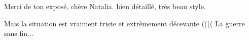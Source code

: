  
 
 
 
 

\qqSecCmt


Merci de ton exposé, chère Natalia. bien détaillé, très beau style.

Mais la situation est vraiment triste et extrêmement décevante (((( La guerre
sans fin...
